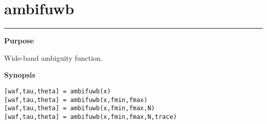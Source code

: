 

\section*{\hspace*{-1.6cm} ambifuwb}

\vspace*{-.4cm}
\hspace*{-1.6cm}\rule[0in]{16.5cm}{.02cm}
\vspace*{.2cm}



{\bf \large \sf Purpose}\\
\hspace*{1.5cm}
\begin{minipage}[t]{13.5cm}
Wide-band ambiguity function.
\end{minipage}
\vspace*{.5cm}


{\bf \large \sf Synopsis}\\
\hspace*{1.5cm}
\begin{minipage}[t]{13.5cm}
\begin{verbatim}
[waf,tau,theta] = ambifuwb(x)
[waf,tau,theta] = ambifuwb(x,fmin,fmax)
[waf,tau,theta] = ambifuwb(x,fmin,fmax,N)
[waf,tau,theta] = ambifuwb(x,fmin,fmax,N,trace)
\end{verbatim}
\end{minipage}
\vspace*{.5cm}


